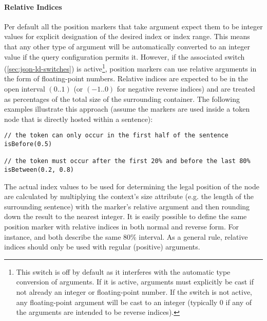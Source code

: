 \documentclass[11pt,a4paper]{article}
\begin{document}
\paragraph{Relative Indices}
\noindent Per default all the position markers that take argument expect them to be integer values for explicit designation of the desired index or index range.
This means that any other type of argument will be automatically converted to an integer value if the query configuration permits it.
However, if the associated switch (\ref{sec:json-ld-switches}) is active\footnote{This switch is off by default as it interferes with the automatic type conversion of arguments. If it is active, arguments must explicitly be cast if not already an integer or floating-point number. If the switch is not active, any floating-point argument will be cast to an integer (typically 0 if any of the arguments are intended to be reverse indices).}, position markers can use relative arguments in the form of floating-point numbers.
Relative indices are expected to be in the open interval $(0..1)$ (or $(-1..0)$ for negative reverse indices) and are treated as percentages of the total size of the surrounding container.
The following examples illustrate this approach (assume the markers are used inside a token node that is directly hosted within a sentence):
\begin{Verbatim}[samepage=true]
// the token can only occur in the first half of the sentence
isBefore(0.5)

// the token must occur after the first 20% and before the last 80%
isBetween(0.2, 0.8)
\end{Verbatim}
The actual index values to be used for determining the legal position of the node are calculated by multiplying the context's size attribute (e.g. the length of the surrounding sentence) with the marker's relative argument and then rounding down the result to the nearest integer.
It is easily possible to define the same position marker with relative indices in both normal and reverse form.
For instance,  and  both describe the same 80\% interval.
As a general rule, relative indices should only be used with regular (positive) arguments.
\end{document}
